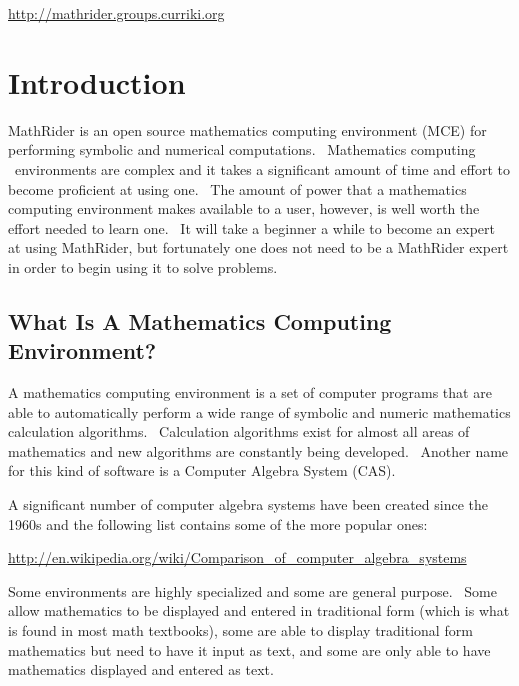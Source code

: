 \documentclass[12pt,twoside]{book}
\begin{document}
\href{http://mathrider.groups.curriki.org}{http://mathrider.groups.curriki.org}



\bigskip

\mainmatter



\chapter[Introduction]{Introduction}
MathRider is an open source mathematics computing environment (MCE) for
performing symbolic and numerical computations. \ Mathematics computing
\ environments are complex and it takes a significant amount of time
and effort to become proficient at using one. \ The amount of power
that a mathematics computing environment makes available to a user,
however, is well worth the effort needed to learn one. \ It will take a
beginner a while to become an expert at using MathRider, but
fortunately one does not need to be a MathRider expert in order to
begin using it to solve problems.

\section[What Is A Mathematics Computing Environment?]{What Is A Mathematics Computing Environment?}
A mathematics computing environment is a set of computer programs that
are able to automatically perform a wide range of symbolic and numeric
mathematics calculation algorithms. \ Calculation algorithms exist for
almost all areas of mathematics and new algorithms are constantly being
developed. \ Another name for this kind of software is a Computer
Algebra System (CAS).


\bigskip

A significant number of computer algebra systems have been created since
the 1960s and the following list contains some of the more popular
ones:


\bigskip

\href{http://en.wikipedia.org/wiki/Comparison_of_computer_algebra_systems}{http://en.wikipedia.org/wiki/Comparison\_of\_computer\_algebra\_systems}


\bigskip

Some environments are highly specialized and some are general purpose.
\ Some allow mathematics to be displayed and entered in traditional
form (which is what is found in most math textbooks), some are able to
display traditional form mathematics but need to have it input as text,
and some are only able to have mathematics displayed and entered as
text.
\end{document}
